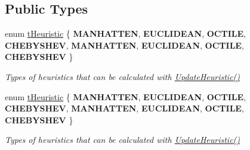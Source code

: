 \subsection*{Public Types}
\begin{DoxyCompactItemize}
\item 
\mbox{\label{classplanner_1_1c_planner_a7f6dc4cbb69dd1ede14a67b0a7bd425b}} 
enum \mbox{\hyperlink{classplanner_1_1c_planner_a7f6dc4cbb69dd1ede14a67b0a7bd425b}{t\+Heuristic}} \{ \newline
{\bfseries M\+A\+N\+H\+A\+T\+T\+EN}, 
{\bfseries E\+U\+C\+L\+I\+D\+E\+AN}, 
{\bfseries O\+C\+T\+I\+LE}, 
{\bfseries C\+H\+E\+B\+Y\+S\+H\+EV}, 
\newline
{\bfseries M\+A\+N\+H\+A\+T\+T\+EN}, 
{\bfseries E\+U\+C\+L\+I\+D\+E\+AN}, 
{\bfseries O\+C\+T\+I\+LE}, 
{\bfseries C\+H\+E\+B\+Y\+S\+H\+EV}
 \}
\begin{DoxyCompactList}\small\item\em Types of heuristics that can be calculated with \mbox{\hyperlink{classplanner_1_1c_planner_ab7cc7c2666de2e49f745901080aac147}{Update\+Heuristic()}} \end{DoxyCompactList}\item 
\mbox{\label{classplanner_1_1c_planner_a7f6dc4cbb69dd1ede14a67b0a7bd425b}} 
enum \mbox{\hyperlink{classplanner_1_1c_planner_a7f6dc4cbb69dd1ede14a67b0a7bd425b}{t\+Heuristic}} \{ \newline
{\bfseries M\+A\+N\+H\+A\+T\+T\+EN}, 
{\bfseries E\+U\+C\+L\+I\+D\+E\+AN}, 
{\bfseries O\+C\+T\+I\+LE}, 
{\bfseries C\+H\+E\+B\+Y\+S\+H\+EV}, 
\newline
{\bfseries M\+A\+N\+H\+A\+T\+T\+EN}, 
{\bfseries E\+U\+C\+L\+I\+D\+E\+AN}, 
{\bfseries O\+C\+T\+I\+LE}, 
{\bfseries C\+H\+E\+B\+Y\+S\+H\+EV}
 \}
\begin{DoxyCompactList}\small\item\em Types of heuristics that can be calculated with \mbox{\hyperlink{classplanner_1_1c_planner_ab7cc7c2666de2e49f745901080aac147}{Update\+Heuristic()}} \end{DoxyCompactList}\end{DoxyCompactItemize}
